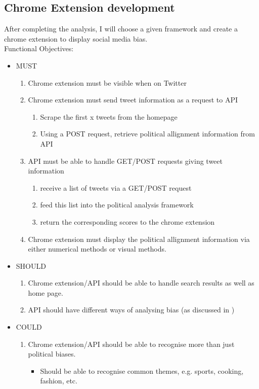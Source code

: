 \documentclass[a4paper,fleqn,10pt]{article}
\begin{document}
\subsection{Chrome Extension development}
After completing the analysis, I will choose a given framework and create a chrome extension to display social media bias.
\\
Functional Objectives:
\begin{itemize}
    \item MUST
    \begin{enumerate}
        \item Chrome extension must be visible when on Twitter
        \item Chrome extension must send tweet information as a request to API 
        \begin{enumerate}
            \item Scrape the first x tweets from the homepage
            \item Using a POST request, retrieve political allignment information from API
        \end{enumerate}
        \item API must be able to handle GET/POST requests giving tweet information
        \begin{enumerate}
            \item receive a list of tweets via a GET/POST request
            \item feed this list into the political analysis framework
            \item return the corresponding scores to the chrome extension
        \end{enumerate}
        \item Chrome extension must display the political allignment information via either numerical methods or visual methods.
    \end{enumerate}
    \item SHOULD
    \begin{enumerate}
        \item Chrome extension/API should be able to handle search results as well as home page.
        \item API should have different ways of analysing bias (as discussed in )
    \end{enumerate}
    \item COULD
    \begin{enumerate}
        \item Chrome extension/API should be able to recognise more than just political biases.
        \begin{itemize}
            \item Should be able to recognise common themes, e.g. sports, cooking, fashion, etc.
        \end{itemize}
    \end{enumerate}
\end{itemize}
\end{document}
